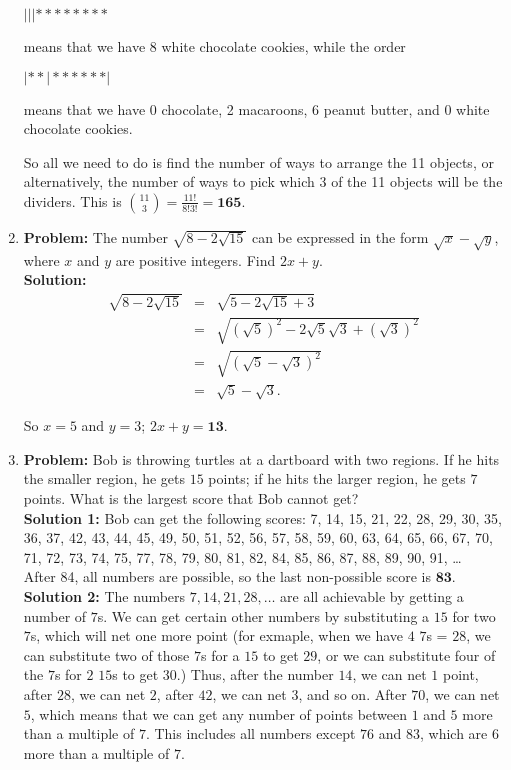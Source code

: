 \documentclass{article}
\begin{document}
\begin{enumerate}
$ | | | * * * * * * * *$

means that we have 8 white chocolate cookies, while the order

$ | * * | * * * * * * |$

means that we have 0 chocolate, 2 macaroons, 6 peanut butter, and 0 white chocolate cookies.

So all we need to do is find the number of ways to arrange the 11 objects, or alternatively, the number of ways to pick which 3 of the 11 objects will be the dividers.  This is $\displaystyle {11\choose 3} = \frac{11!}{8!3!} = \mathbf{165}$.

\item \textbf{Problem:} The number $\sqrt{8 - 2 \sqrt{15}}$ can be expressed in the form $\sqrt{x} - \sqrt{y}$, where $x$ and $y$ are positive integers.  Find $2x+y$. \\

\textbf{Solution:}
\begin{eqnarray*}
\sqrt{8 - 2 \sqrt{15}} &=& \sqrt{5 - 2\sqrt{15} + 3} \\
&=& \sqrt{(\sqrt{5})^2 - 2\sqrt{5} \sqrt{3} + (\sqrt{3})^2}  \\
&=& \sqrt{(\sqrt{5} - \sqrt{3})^2} \\
&=& \sqrt{5} - \sqrt{3}.
\end{eqnarray*}

So $x = 5$ and $y = 3$; $2x + y = \mathbf{13}$.

\item \textbf{Problem:} Bob is throwing turtles at a dartboard with two regions.  If he hits the smaller region, he gets $15$ points; if he hits the larger region, he gets $7$ points.  What is the largest score that Bob cannot get? \\

\textbf{Solution 1:} Bob can get the following scores: 7, 14, 15, 21, 22, 28, 29, 30, 35, 36, 37, 42, 43, 44, 45, 49, 50, 51, 52, 56, 57, 58, 59, 60, 63, 64, 65, 66, 67, 70, 71, 72, 73, 74, 75, 77, 78, 79, 80, 81, 82, 84, 85, 86, 87, 88, 89, 90, 91, \ldots  \\

After 84, all numbers are possible, so the last non-possible score is $\mathbf{83}$. \\

\textbf{Solution 2:} The numbers $7, 14, 21, 28, \ldots$ are all achievable by getting a number of $7$s.  We can get certain other numbers by substituting a $15$ for two $7$s, which will net one more point (for exmaple, when we have $4$ $7$s = $28$, we can substitute two of those $7$s for a $15$ to get $29$, or we can substitute four of the $7$s for $2$ $15$s to get $30$.)  Thus, after the number $14$, we can net $1$ point, after $28$, we can net $2$, after $42$, we can net $3$, and so on.  After $70$, we can net $5$, which means that we can get any number of points between $1$ and $5$ more than a multiple of $7$.  This includes all numbers except $76$ and $83$, which are $6$ more than a multiple of $7$. \\


\end{enumerate}
\end{document}
